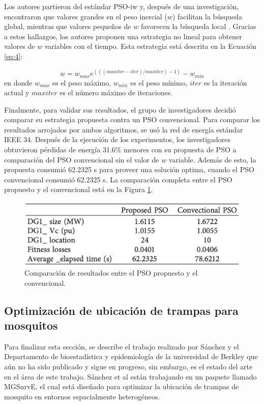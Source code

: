  Los autores partieron del estándar PSO-iw y, después de una investigación,
  encontraron que valores grandes en el peso inercial ($w$) facilitan la
  búsqueda global, mientras que valores pequeños de $w$ favorecen la búsqueda
  local \cite{CPSO, APSO2016}. Gracias a estos hallazgos, los autores proponen
  una estrategia no
  lineal para obtener valores de $w$ variables con el tiempo. Esta estrategia
  está descrita en la Ecuación \ref{eq:4}:

  \begin{equation}
    \label{eq:4}
    w = w_{max} e^{(((maxiter - iter) / maxiter) - 1)} - w_{min} 
  \end{equation}
  en donde $w_{max}$ es el peso máximo, $w_{min}$ es el peso mínimo, $iter$ es
  la iteración actual y $maxiter$ es el número máximo de iteraciones.

  Finalmente, para validar sus resultados, el grupo de investigadores
  decidió comparar su
  estrategia propuesta contra un PSO convencional. Para comparar los
  resultados arrojados por ambos algoritmos, se usó la red de energía estándar
  IEEE 34. Después de la ejecución de los experimentos, los investigadores
  obtuvieron pérdidas de energía 31.6\% menores con su propuesta de PSO a
  comparación del PSO convencional sin el valor de $w$ variable. Además de
  esto, la propuesta consumió 62.2325 s para proveer una solución optima,
  cuando el PSO convencional consumió 62.2325 s. La comparación completa
  entre el PSO propuesto y el convencional está en la Figura
  \ref{fig:pso-iw-variable-comp}.

  \begin{figure}[ht!]
    \includegraphics[width=\textwidth]{pso-iw-variable-comp.png}
    \centering
    \caption{Comparación de resultados entre el PSO propuesto y el
      convencional.}
    \label{fig:pso-iw-variable-comp}
    \centering
  \end{figure}

\subsection{Optimización de ubicación de trampas para mosquitos}
  \label{subsection:mgsurve}
  Para finalizar esta sección, se describe el
  trabajo realizado por Sánchez y el Departamento de bioestadística y
  epidemiología de la universidad de Berkley \cite{MGSurvE} que aún no ha sido
  publicado y sigue en progreso, sin embargo, es el estado del arte en el área
  de este trabajo. Sánchez et al están trabajando en un paquete llamado
  MGSurvE, el cual está diseñado para optimizar la ubicación de trampas de
  mosquito en entornos espacialmente heterogéneos. 

